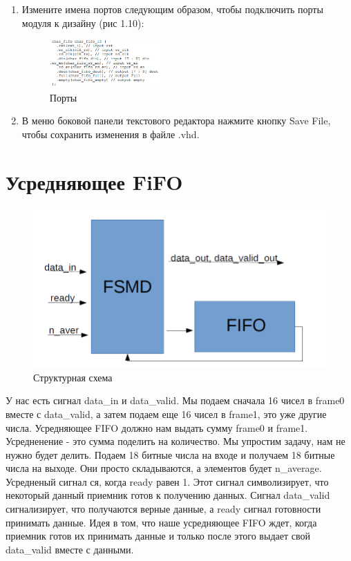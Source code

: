 \begin{enumerate}
\item Измените имена портов следующим образом, чтобы подключить порты модуля к дизайну (рис 1.10):

\begin{figure}[h]
\centering
\includegraphics[width=0.4\textwidth]{fifo_ip_10}
\caption{Порты}
\label{fifo_ip_10_label}
\end{figure}

\item В меню боковой панели текстового редактора нажмите кнопку Save File, чтобы сохранить изменения в файле .vhd.
\end{enumerate}

\section{Усредняющее FiFO}
\begin{figure}[h]
\centering
\includegraphics[width=1.1\textwidth]{structure}
\caption{Структурная схема}
\label{struct}
\end{figure}

У нас есть сигнал data\_in и data\_valid. Мы подаем сначала 16 чисел в frame0 вместе с data\_valid, а затем подаем еще 16 чисел в frame1, это уже другие числа. Усредняющее FIFO должно нам выдать сумму frame0 и frame1. Усредненение - это сумма поделить на количество. Мы упростим задачу, нам не нужно будет делить. Подаем 18 битные числа на входе и получаем 18 битные числа на выходе. Они просто складываются, а элементов будет n\_average. Усредненый сигнал 
ся, когда ready равен 1. Этот сигнал символизирует, что некоторый данный приемник готов к получению данных. Сигнал data\_valid сигнализирует, что получаются верные данные, а ready сигнал готовности принимать данные.
Идея в том, что наше усредняющее FIFO ждет, когда приемник готов их принимать данные и только после этого выдает свой data\_valid вместе с данными.

